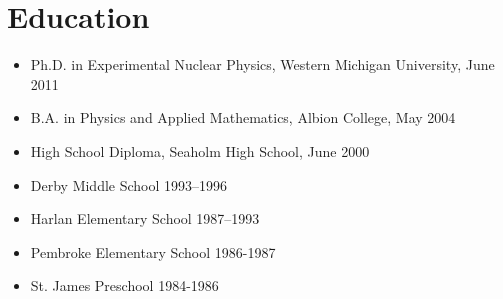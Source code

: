 \clearpage
\pagestyle{fancy}
%

\nameaddress{\homeaddress}
\section*{Education}
\begin{itemize}
		\item Ph.D. in Experimental Nuclear Physics, Western Michigan University, June 2011%
	\item B.A. in Physics and Applied Mathematics, Albion College, May 2004 %
	\item High School Diploma, Seaholm High School, June 2000 %
	\item Derby Middle School 1993--1996 %
	\item Harlan Elementary School 1987--1993 %
	\item Pembroke Elementary School 1986-1987 %
	\item St. James Preschool 1984-1986 %
\end{itemize}

